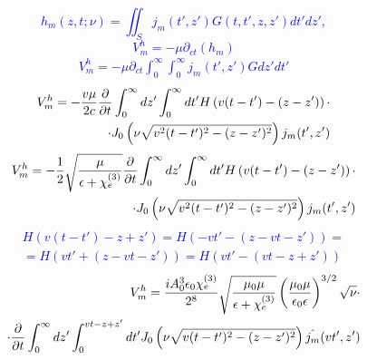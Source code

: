 \textcolor{blue}{ \begin{equation*} 
h_m (z, t; \nu) = \iint_S j_m (t',z') G(t,t',z,z') dt' dz',
\end{equation*} }
%
\textcolor{blue}{ \begin{equation*}
V_m^h = - \mu \partial_{ct} (h_m)
\end{equation*} }
%
\textcolor{blue} { \begin{equation*} \begin{aligned} 
V_m^h = - \mu \partial_{ct} \int_0^\infty \int_0^\infty j_m (t',z') G dz' dt'
\end{aligned} \end{equation*} }
%
\textcolor{blue} { \begin{equation*} \begin{aligned} 
V_m^h = - \frac{v \mu}{2c}
\frac{\partial }{\partial t} \int_0^\infty dz' \int_0^\infty 
dt' H \left( v (t-t') - (z-z') \right) \cdot \\
\cdot J_0 \left( \nu \sqrt{v^2 (t-t')^2 - (z-z')^2} \right) j_m (t',z')
\end{aligned} \end{equation*} }
%
\textcolor{blue} { \begin{equation*} \begin{aligned} 
V_m^h = - \frac{1}{2} \sqrt{\frac{\mu}{\epsilon + \chi_e^{(3)}}}
\frac{\partial }{\partial t} \int_0^\infty dz' \int_0^\infty 
dt' H \left( v (t-t') - (z-z') \right) \cdot \\
\cdot J_0 \left( \nu \sqrt{v^2 (t-t')^2 - (z-z')^2} \right) j_m (t',z')
\end{aligned} \end{equation*} }
%
\textcolor{blue} { \begin{equation*} \begin{aligned} 
H \left( v (t-t') - z + z' \right) = 
H \left( - vt' - ( z - vt - z' ) \right) = \\
= H \left( vt' + ( z - vt - z' ) \right) = 
H \left( vt' - ( vt - z + z' ) \right)
\end{aligned} \end{equation*} }
%
\begin{equation} \begin{aligned} 
V_m^h = \frac{i A_0^3 \epsilon_0 \chi_e^{(3)}}{2^8}
\sqrt{\frac{\mu_0 \mu}{\epsilon + \chi_e^{(3)}}} 
\left( \frac{\mu_0 \mu}{\epsilon_0 \epsilon} \right)^{3/2} \sqrt{\nu} 
\cdot \\ \cdot \frac{\partial }{\partial t} \int_0^\infty dz' \int_0^{vt - z + z'} dt'
J_0 \left( \nu \sqrt{v(t-t')^2 - (z-z')^2} \right) \hat{j_m} (vt',z')
\end{aligned} \end{equation}

